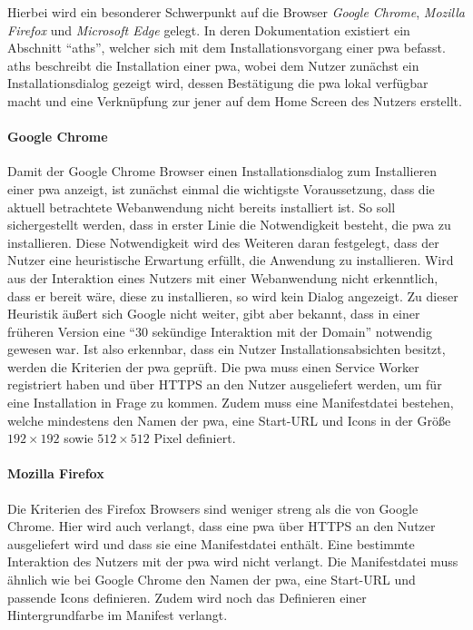 \documentclass[12pt, parskip=half]{scrartcl}       %
\begin{document}
Hierbei wird ein besonderer Schwerpunkt auf die Browser \textit{Google Chrome}, \textit{Mozilla Firefox} und \textit{Microsoft Edge} gelegt.
In deren Dokumentation\cite{googledev_pwainstallcriteria,docsmicrosoft_pwainstallcriteria,mozilladev_pwainstallcriteria} existiert ein Abschnitt \enquote{\ac{aths}}, welcher sich mit dem Installationsvorgang einer \ac{pwa} befasst.
\ac{aths} beschreibt die Installation einer \ac{pwa}, wobei dem Nutzer zunächst ein Installationsdialog gezeigt wird, dessen Bestätigung die \ac{pwa} lokal verfügbar macht und eine Verknüpfung zur jener auf dem Home Screen des Nutzers erstellt.


\paragraph{Google Chrome}
Damit der Google Chrome Browser einen Installationsdialog zum Installieren einer \ac{pwa} anzeigt, ist zunächst einmal die wichtigste Voraussetzung, dass die aktuell betrachtete Webanwendung nicht bereits installiert ist.
So soll sichergestellt werden, dass in erster Linie die Notwendigkeit besteht, die \ac{pwa} zu installieren.
Diese Notwendigkeit wird des Weiteren daran festgelegt, dass der Nutzer eine heuristische Erwartung erfüllt, die Anwendung zu installieren.
Wird aus der Interaktion eines Nutzers mit einer Webanwendung nicht erkenntlich, dass er bereit wäre, diese zu installieren, so wird kein Dialog angezeigt.
Zu dieser Heuristik äußert sich Google nicht weiter, gibt aber bekannt, dass in einer früheren Version eine \enquote{30 sekündige Interaktion mit der Domain} notwendig gewesen war.
Ist also erkennbar, dass ein Nutzer Installationsabsichten besitzt, werden die Kriterien der \ac{pwa} geprüft.
Die \ac{pwa} muss einen Service Worker registriert haben und über HTTPS an den Nutzer ausgeliefert werden, um für eine Installation in Frage zu kommen.
Zudem muss eine Manifestdatei bestehen, welche mindestens den Namen der \ac{pwa}, eine Start-URL und Icons in der Größe $192\times192$ sowie $512\times512$ Pixel definiert.

\paragraph{Mozilla Firefox}
Die Kriterien des Firefox Browsers sind weniger streng als die von Google Chrome.
Hier wird auch verlangt, dass eine \ac{pwa} über HTTPS an den Nutzer ausgeliefert wird und dass sie eine Manifestdatei enthält.
Eine bestimmte Interaktion des Nutzers mit der \ac{pwa} wird nicht verlangt.
Die Manifestdatei muss ähnlich wie bei Google Chrome den Namen der \ac{pwa}, eine Start-URL und passende Icons definieren.
Zudem wird noch das Definieren einer Hintergrundfarbe im Manifest verlangt.
\end{document}
